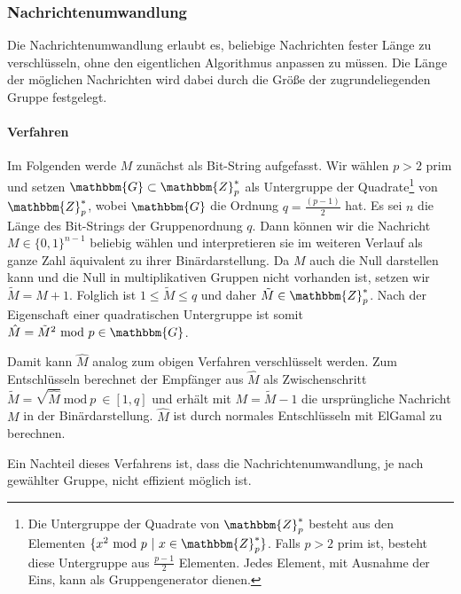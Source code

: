 \subsubsection{Nachrichtenumwandlung} Die Nachrichtenumwandlung erlaubt
es, beliebige Nachrichten fester Länge zu verschlüsseln, ohne den
eigentlichen Algorithmus anpassen zu müssen. Die Länge der möglichen
Nachrichten wird dabei durch die Größe der zugrundeliegenden Gruppe
festgelegt.

\paragraph*{Verfahren} Im Folgenden werde $M$ zunächst als Bit-String
aufgefasst. Wir wählen $p > 2 $ prim und setzen $\mathbbm{G} \subset
\mathbbm{Z}^*_p$ als Untergruppe der Quadrate\footnote{Die Untergruppe
der Quadrate von $\mathbbm{Z}^*_p$ besteht aus den Elementen $\{x^2
\text{ mod } p\ \vert\ x \in \mathbbm{Z}^*_p\}$. Falls $p > 2$ prim ist,
besteht diese Untergruppe aus $\frac{p - 1}{2}$ Elementen. Jedes
Element, mit Ausnahme der Eins, kann als Gruppengenerator dienen.} von
$\mathbbm{Z}^*_p$, wobei $\mathbbm{G}$ die Ordnung $q = \frac{(p -
1)}{2}$ hat.  Es sei $n$ die Länge des Bit-Strings der Gruppenordnung
$q$. Dann können wir die Nachricht $M \in \{0, 1\}^{n - 1}$ beliebig
wählen und interpretieren sie im weiteren Verlauf als ganze Zahl
äquivalent zu ihrer Binärdarstellung. Da $M$ auch die Null darstellen
kann und die Null in multiplikativen Gruppen nicht vorhanden ist, setzen
wir $\tilde{M} = M + 1$. Folglich ist $ 1 \leq \tilde{M} \leq q$ und
daher $\tilde{M} \in \mathbbm{Z}^*_p$. Nach der Eigenschaft einer
quadratischen Untergruppe ist somit $\hat{M} = \tilde{M}^2 \text{ mod }
p \in \mathbbm{G}$.

Damit kann $\hat{M}$ analog zum obigen Verfahren verschlüsselt
werden. Zum Entschlüsseln berechnet der Empfänger aus $\hat{M}$ als
Zwischenschritt $\tilde{M} = \sqrt{\hat{M}}\ \text{mod}\ p\ \in [1, q]$
und erhält mit $M = \tilde{M} - 1$ die ursprüngliche Nachricht $M$ in
der Binärdarstellung. $\hat{M}$ ist durch normales Entschlüsseln mit
ElGamal zu berechnen.

Ein Nachteil dieses Verfahrens ist, dass die Nachrichtenumwandlung, je
nach gewählter Gruppe, nicht effizient möglich ist.

